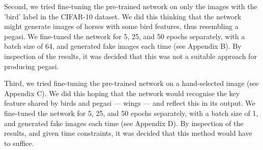 \documentclass{article}
\begin{document}
Second, we tried fine-tuning the pre-trained network on only the images with the 'bird' label in the CIFAR-10 dataset. We did this thinking that the network might generate images of horses with some bird features, thus resembling a pegasi. We fine-tuned the network for 5, 25, and 50 epochs separately, with a batch size of 64, and generated fake images each time (see Appendix B). By inspection of the results, it was decided that this was not a suitable approach for producing pegasi.  

Third, we tried fine-tuning the pre-trained network on a hand-selected image (see Appendix C). We did this hoping that the network would recognise the key feature shared by birds and pegasi --- wings --- and reflect this in its output. We fine-tuned the network for 5, 25, and 50 epochs separately, with a batch size of 1, and generated fake images each time (see Appendix D). By inspection of the results, and given time constraints, it was decided that this method would have to suffice.

\printbibliography
\end{document}

